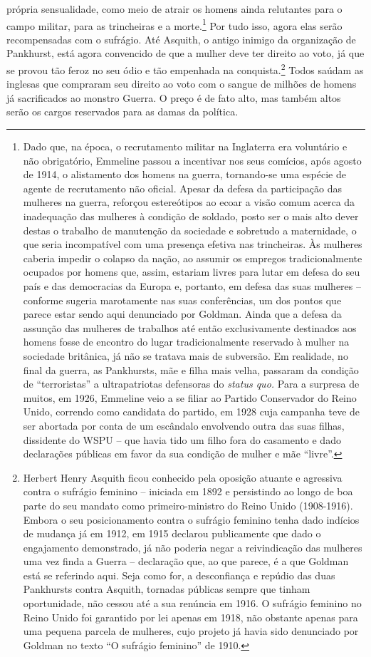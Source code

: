 própria sensualidade, como meio de atrair os homens ainda relutantes
para o campo militar, para as trincheiras e a morte.\footnote{Dado que,
  na época, o recrutamento militar na Inglaterra era voluntário e não
  obrigatório, Emmeline passou a incentivar nos seus comícios, após
  agosto de 1914, o alistamento dos homens na guerra, tornando-se uma
  espécie de agente de recrutamento não oficial. Apesar da defesa da
  participação das mulheres na guerra, reforçou estereótipos ao ecoar a
  visão comum acerca da inadequação das mulheres à condição de soldado,
  posto ser o mais alto dever destas o trabalho de manutenção da
  sociedade e sobretudo a maternidade, o que seria incompatível com uma
  presença efetiva nas trincheiras. Às mulheres caberia impedir o
  colapso da nação, ao assumir os empregos tradicionalmente ocupados por
  homens que, assim, estariam livres para lutar em defesa do seu país e
  das democracias da Europa e, portanto, em defesa das suas mulheres --
  conforme sugeria marotamente nas suas conferências, um dos pontos que
  parece estar sendo aqui denunciado por Goldman. Ainda que a defesa da
  assunção das mulheres de trabalhos até então exclusivamente destinados
  aos homens fosse de encontro do lugar tradicionalmente reservado à
  mulher na sociedade britânica, já não se tratava mais de subversão. Em
  realidade, no final da guerra, as Pankhursts, mãe e filha mais velha,
  passaram da condição de ``terroristas'' a ultrapatriotas defensoras do
  \emph{status quo.} Para a surpresa de muitos, em 1926, Emmeline veio a
  se filiar ao Partido Conservador do Reino Unido, correndo como
  candidata do partido, em 1928 cuja campanha teve de ser abortada por
  conta de um escândalo envolvendo outra das suas filhas, dissidente do
  WSPU -- que havia tido um filho fora do casamento e dado declarações
  públicas em favor da sua condição de mulher e mãe ``livre''.} Por tudo
isso, agora elas serão recompensadas ​​com o sufrágio. Até Asquith, o
antigo inimigo da organização de Pankhurst, está agora convencido de que
a mulher deve ter direito ao voto, já que se provou tão feroz no seu
ódio e tão empenhada na conquista.\footnote{Herbert Henry Asquith ficou
  conhecido pela oposição atuante e agressiva contra o sufrágio feminino
  -- iniciada em 1892 e persistindo ao longo de boa parte do seu mandato
  como primeiro-ministro do Reino Unido (1908-1916). Embora o seu
  posicionamento contra o sufrágio feminino tenha dado indícios de
  mudança já em 1912, em 1915 declarou publicamente que dado o
  engajamento demonstrado, já não poderia negar a reivindicação das
  mulheres uma vez finda a Guerra -- declaração que, ao que parece, é a
  que Goldman está se referindo aqui. Seja como for, a desconfiança e
  repúdio das duas Pankhursts contra Asquith, tornadas públicas sempre
  que tinham oportunidade, não cessou até a sua renúncia em 1916. O
  sufrágio feminino no Reino Unido foi garantido por lei apenas em 1918,
  não obstante apenas para uma pequena parcela de mulheres, cujo projeto
  já havia sido denunciado por Goldman no texto ``O sufrágio feminino''
  de 1910.} Todos saúdam as inglesas que compraram seu direito ao voto
com o sangue de milhões de homens já sacrificados ao monstro Guerra. O
preço é de fato alto, mas também altos serão os cargos reservados para
as damas da política.

